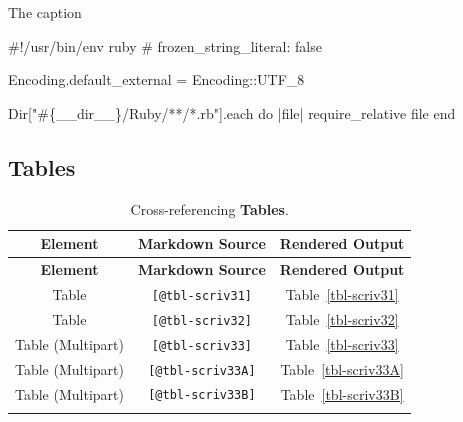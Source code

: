 \documentclass[
  12pt,
  a4paper,
  oneside,
  titlepage,
  toclink=all,
  toc=bibliography]{scrbook}
\newenvironment{Shaded}{\begin{snugshade}}{\end{snugshade}}
\newcommand{\AttributeTok}[1]{\textcolor[rgb]{0.40,0.45,0.13}{#1}}
\newcommand{\CommentTok}[1]{\textcolor[rgb]{0.37,0.37,0.37}{#1}}
\newcommand{\ControlFlowTok}[1]{\textcolor[rgb]{0.00,0.23,0.31}{#1}}
\newcommand{\DataTypeTok}[1]{\textcolor[rgb]{0.68,0.00,0.00}{#1}}
\newcommand{\FunctionTok}[1]{\textcolor[rgb]{0.28,0.35,0.67}{#1}}
\newcommand{\KeywordTok}[1]{\textcolor[rgb]{0.00,0.23,0.31}{#1}}
\newcommand{\NormalTok}[1]{\textcolor[rgb]{0.00,0.23,0.31}{#1}}
\newcommand{\SpecialCharTok}[1]{\textcolor[rgb]{0.37,0.37,0.37}{#1}}
\newcommand{\StringTok}[1]{\textcolor[rgb]{0.13,0.47,0.30}{#1}}
\theoremstyle{definition}
\theoremstyle{plain}
\theoremstyle{plain}
\theoremstyle{plain}
\theoremstyle{plain}
\theoremstyle{definition}
\theoremstyle{definition}
\theoremstyle{plain}
\theoremstyle{remark}
\begin{document}
\begin{codelisting}

\caption{The caption}

\hypertarget{lst-scriv29}{%
\label{lst-scriv29}}%
\begin{Shaded}
\begin{Highlighting}[numbers=left,,]

\ControlFlowTok{\#!/usr/bin/env ruby}
\CommentTok{\# frozen\_string\_literal: false}

\DataTypeTok{Encoding}\AttributeTok{.default\_external} \KeywordTok{=} \DataTypeTok{Encoding}\KeywordTok{::}\DataTypeTok{UTF\_8}

\DataTypeTok{Dir}\KeywordTok{[}\StringTok{"}\SpecialCharTok{\#\{}\NormalTok{\_\_dir\_\_}\SpecialCharTok{\}}\StringTok{/Ruby/**/*.rb"}\KeywordTok{]}\AttributeTok{.each} \ControlFlowTok{do} \KeywordTok{|}\NormalTok{file}\KeywordTok{|}
  \FunctionTok{require\_relative}\NormalTok{ file}
\ControlFlowTok{end}
\end{Highlighting}
\end{Shaded}

\end{codelisting}

\hypertarget{sec-scriv30}{%
\subsection{Tables}\label{sec-scriv30}}

\protect\hypertarget{scriv30}{}{}

\hypertarget{tbl-scriv30}{}
\begin{longtable}[]{@{}ccc@{}}
\toprule\noalign{}
\textbf{Element} & \textbf{Markdown Source} & \textbf{Rendered
Output} \\
\midrule\noalign{}
\endfirsthead
\toprule\noalign{}
\textbf{Element} & \textbf{Markdown Source} & \textbf{Rendered
Output} \\
\midrule\noalign{}
\endhead
\bottomrule\noalign{}
\endlastfoot
Table & \texttt{{[}@tbl-scriv31{]}} &
\protect\hypertarget{cite_67}{}{\label{cite_67}Table~\ref{tbl-scriv31}} \\
Table & \texttt{{[}@tbl-scriv32{]}} &
\protect\hypertarget{cite_68}{}{\label{cite_68}Table~\ref{tbl-scriv32}} \\
Table (Multipart) & \texttt{{[}@tbl-scriv33{]}} &
\protect\hypertarget{cite_69}{}{\label{cite_69}Table~\ref{tbl-scriv33}} \\
Table (Multipart) & \texttt{{[}@tbl-scriv33A{]}} &
\protect\hypertarget{cite_70}{}{\label{cite_70}Table~\ref{tbl-scriv33A}} \\
Table (Multipart) & \texttt{{[}@tbl-scriv33B{]}} &
\protect\hypertarget{cite_71}{}{\label{cite_71}Table~\ref{tbl-scriv33B}} \\
\caption{\label{tbl-scriv30}Cross-referencing
\textbf{Tables}.}\tabularnewline
\end{longtable}
\end{document}
